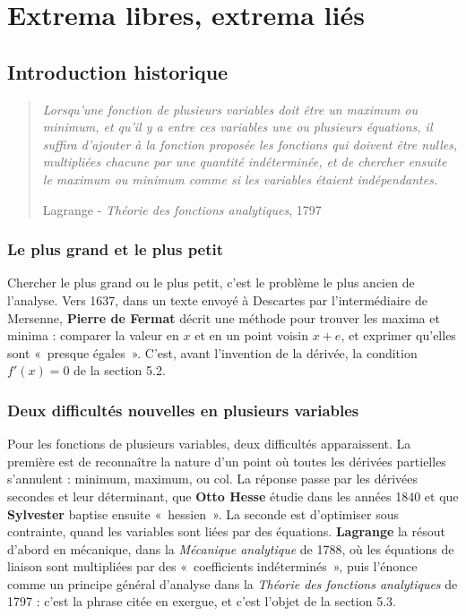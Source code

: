 \documentclass[a4paper,twoside]{report}
\begin{document}
\setcounter{chapter}{4}

\chapter[Extrema libres, extrema liés]{Extrema libres, extrema liés}

\section{Introduction historique}

\begin{quote}
\emph{Lorsqu'une fonction de plusieurs variables doit être un maximum ou minimum, et qu'il y a entre ces variables une ou plusieurs équations, il suffira d'ajouter à la fonction proposée les fonctions qui doivent être nulles, multipliées chacune par une quantité indéterminée, et de chercher ensuite le maximum ou minimum comme si les variables étaient indépendantes.}
\begin{flushright}Lagrange - \emph{Théorie des fonctions analytiques}, 1797\end{flushright}
\end{quote}

\subsection{Le plus grand et le plus petit}

Chercher le plus grand ou le plus petit, c'est le problème le plus ancien de l'analyse. Vers 1637, dans un texte envoyé à Descartes par l'intermédiaire de Mersenne, \textbf{Pierre de Fermat} décrit une méthode pour trouver les maxima et minima : comparer la valeur en $x$ et en un point voisin $x + e$, et exprimer qu'elles sont «~presque égales~». C'est, avant l'invention de la dérivée, la condition $f'(x) = 0$ de la section 5.2.

\subsection{Deux difficultés nouvelles en plusieurs variables}

Pour les fonctions de plusieurs variables, deux difficultés apparaissent. La première est de reconnaître la nature d'un point où toutes les dérivées partielles s'annulent : minimum, maximum, ou col. La réponse passe par les dérivées secondes et leur déterminant, que \textbf{Otto Hesse} étudie dans les années 1840 et que \textbf{Sylvester} baptise ensuite «~hessien~». La seconde est d'optimiser sous contrainte, quand les variables sont liées par des équations. \textbf{Lagrange} la résout d'abord en mécanique, dans la \emph{Mécanique analytique} de 1788, où les équations de liaison sont multipliées par des «~coefficients indéterminés~», puis l'énonce comme un principe général d'analyse dans la \emph{Théorie des fonctions analytiques} de 1797 : c'est la phrase citée en exergue, et c'est l'objet de la section 5.3.
\end{document}
